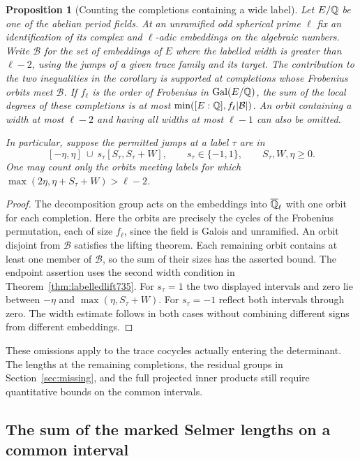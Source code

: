 \documentclass[a4paper,11pt]{article}
\newtheorem{proposition}{Proposition}[section]
\theoremstyle{definition}
\theoremstyle{remark}
\numberwithin{equation}{section}
\begin{document}
\begin{proposition}[Counting the completions containing a wide label]\leavevmode
\label{prop:orbits735}
Let \(E/\mathbb Q\) be one of the abelian period fields. At an unramified
odd spherical prime \(\ell\) fix an identification of its complex
and \(\ell\)-adic embeddings on the algebraic numbers. Write
\(\mathcal B\) for the set of embeddings of \(E\) where the
labelled width is greater than \(\ell-2\), using the jumps of a
given trace family and its target. The contribution to the two
inequalities in the corollary is supported at completions whose
Frobenius orbits meet \(\mathcal B\). If \(f_\ell\) is the order
of Frobenius in \(\operatorname{Gal}(E/\mathbb Q)\), the sum of the local
degrees of these completions is at most
\(\min([E:\mathbb Q], f_\ell|\mathcal B|)\). An orbit containing a
width at most \(\ell-2\) and having all widths at most \(\ell-1\)
can also be omitted.

In particular, suppose the permitted jumps at a label \(\tau\)
are in
\[
 [-\eta,\eta]\ \cup\
       s_\tau [S_\tau,S_\tau+W],\qquad s_\tau\in\{-1,1\},
 \qquad S_\tau,W,\eta\ge0 .
\]
One may count only the orbits meeting labels for which
\(\max(2\eta,\eta+S_\tau+W)>\ell-2\).
\end{proposition}
\begin{proof}
The decomposition group acts on the embeddings into
\(\overline{\mathbb Q}_\ell\) with one orbit for each completion.
Here the orbits are precisely the cycles of the Frobenius
permutation, each of size \(f_\ell\), since the field is Galois and
unramified. An orbit disjoint from \(\mathcal B\) satisfies the
lifting theorem. Each remaining orbit contains at least one
member of \(\mathcal B\), so the sum of their sizes has the
asserted bound. The endpoint assertion uses the second width
condition in Theorem~\ref{thm:labelledlift735}.
For \(s_\tau=1\) the two displayed intervals and zero lie between
\(-\eta\) and \(\max(\eta,S_\tau+W)\).
For \(s_\tau=-1\) reflect both intervals through zero.
The width estimate follows in both cases without combining
different signs from different embeddings.
\end{proof}

These omissions apply to the trace cocycles actually entering the
determinant. The lengths at the remaining completions, the residual
groups in Section~\ref{sec:missing}, and the full projected inner
products still require quantitative bounds on the common intervals.
\clearpage

\subsection{The sum of the marked Selmer lengths on a common interval}
\label{sec:oddselmer739}
\end{document}
